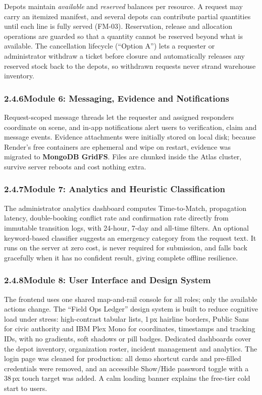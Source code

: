 \documentclass[11pt,a4paper]{article}
\begin{document}
Depots maintain \emph{available} and \emph{reserved} balances per resource. A request may carry an itemized manifest, and several depots can contribute partial quantities until each line is fully served (FM-03). Reservation, release and allocation operations are guarded so that a quantity cannot be reserved beyond what is available. The cancellation lifecycle (``Option A'') lets a requester or administrator withdraw a ticket before closure and automatically releases any reserved stock back to the depots, so withdrawn requests never strand warehouse inventory.

\subsubsection{2.4.6\quad Module 6: Messaging, Evidence and Notifications}\label{s246}

Request-scoped message threads let the requester and assigned responders coordinate on scene, and in-app notifications alert users to verification, claim and message events. Evidence attachments were initially stored on local disk; because Render's free containers are ephemeral and wipe on restart, evidence was migrated to \textbf{MongoDB GridFS}. Files are chunked inside the Atlas cluster, survive server reboots and cost nothing extra.

\subsubsection{2.4.7\quad Module 7: Analytics and Heuristic Classification}\label{s247}

The administrator analytics dashboard computes Time-to-Match, propagation latency, double-booking conflict rate and confirmation rate directly from immutable transition logs, with 24-hour, 7-day and all-time filters. An optional keyword-based classifier suggests an emergency category from the request text. It runs on the server at zero cost, is never required for submission, and falls back gracefully when it has no confident result, giving complete offline resilience.

\subsubsection{2.4.8\quad Module 8: User Interface and Design System}\label{s248}

The frontend uses one shared map-and-rail console for all roles; only the available actions change. The ``Field Ops Ledger'' design system is built to reduce cognitive load under stress: high-contrast tabular lists, 1\,px hairline borders, Public Sans for civic authority and IBM Plex Mono for coordinates, timestamps and tracking IDs, with no gradients, soft shadows or pill badges. Dedicated dashboards cover the depot inventory, organization roster, incident management and analytics. The login page was cleaned for production: all demo shortcut cards and pre-filled credentials were removed, and an accessible Show/Hide password toggle with a 38\,px touch target was added. A calm loading banner explains the free-tier cold start to users.
\end{document}

